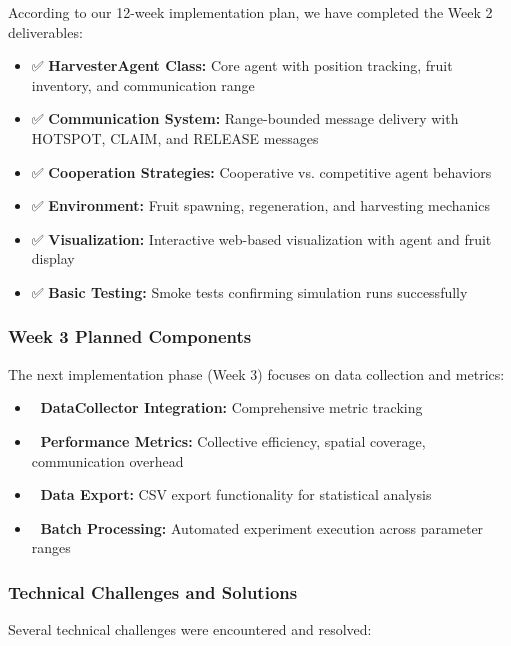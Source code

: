 \documentclass[12pt,a4paper]{article}
\begin{document}
According to our 12-week implementation plan, we have completed the Week 2 deliverables:

\begin{itemize}
    \item ✅ \textbf{HarvesterAgent Class:} Core agent with position tracking, fruit inventory, and communication range
    \item ✅ \textbf{Communication System:} Range-bounded message delivery with HOTSPOT, CLAIM, and RELEASE messages
    \item ✅ \textbf{Cooperation Strategies:} Cooperative vs. competitive agent behaviors
    \item ✅ \textbf{Environment:} Fruit spawning, regeneration, and harvesting mechanics
    \item ✅ \textbf{Visualization:} Interactive web-based visualization with agent and fruit display
    \item ✅ \textbf{Basic Testing:} Smoke tests confirming simulation runs successfully
\end{itemize}

\subsubsection{Week 3 Planned Components}

The next implementation phase (Week 3) focuses on data collection and metrics:

\begin{itemize}
    \item 🔄 \textbf{DataCollector Integration:} Comprehensive metric tracking
    \item 🔄 \textbf{Performance Metrics:} Collective efficiency, spatial coverage, communication overhead
    \item 🔄 \textbf{Data Export:} CSV export functionality for statistical analysis
    \item 🔄 \textbf{Batch Processing:} Automated experiment execution across parameter ranges
\end{itemize}

\subsubsection{Technical Challenges and Solutions}

Several technical challenges were encountered and resolved:
\end{document}
